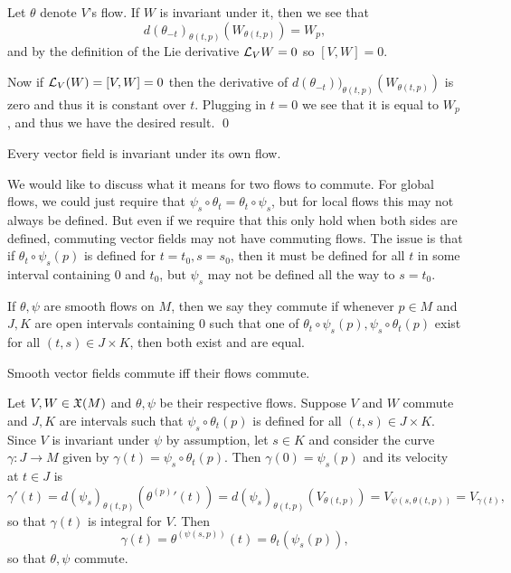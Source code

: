 \ethrm

\bproof

    Let $\theta$ denote $V$'s flow.
    If $W$ is invariant under it, then we see that
    $$ d(\theta_{-t})_{\theta(t,p)}(W_{\theta(t,p)}) = W_p , $$
    and by the definition of the Lie derivative ${{\cal L}}_VW=0$ so $[V,W]=0$.

    Now if ${{\cal L}}_V(W)=[V,W]=0$ then the derivative of $d(\theta_{-t}))_{\theta(t,p)}(W_{\theta(t,p)})$ is zero
    and thus it is constant over $t$.
    Plugging in $t=0$ we see that it is equal to $W_p$, and thus we have the desired result.
    \qed

\eproof

\bcoro

    Every vector field is invariant under its own flow.

\ecoro

We would like to discuss what it means for two flows to commute.
For global flows, we could just require that $\psi_s\circ\theta_t=\theta_t\circ\psi_s$, but for local flows this may not
always be defined.
But even if we require that this only hold when both sides are defined, commuting vector fields may not have commuting flows.
The issue is that if $\theta_t\circ\psi_s(p)$ is defined for $t=t_0,s=s_0$, then it must be defined for all $t$ in some
interval containing $0$ and $t_0$, but $\psi_s$ may not be defined all the way to $s=t_0$.

\bdefn

    If $\theta,\psi$ are smooth flows on $M$, then we say they {\emphcolor commute} if whenever $p\in M$ and
    $J,K$ are open intervals containing $0$ such that one of $\theta_t\circ\psi_s(p),\psi_s\circ\theta_t(p)$ exist
    for all $(t,s)\in J\times K$, then both exist and are equal.

\edefn

\bthrm

    Smooth vector fields commute iff their flows commute.

\ethrm

\bproof

    Let $V,W\in{\frak X}(M)$ and $\theta,\psi$ be their respective flows.
    Suppose $V$ and $W$ commute and $J,K$ are intervals such that $\psi_s\circ\theta_t(p)$ is defined for all
    $(t,s)\in J\times K$.
    Since $V$ is invariant under $\psi$ by assumption, let $s\in K$ and consider the curve $\gamma\colon J\to M$
    given by $\gamma(t)=\psi_s\circ\theta_t(p)$.
    Then $\gamma(0)=\psi_s(p)$ and its velocity at $t\in J$ is
    $$ \gamma'(t) = d(\psi_s)_{\theta(t,p)}({\theta^{(p)}}'(t)) = d(\psi_s)_{\theta(t,p)}(V_{\theta(t,p)})
    = V_{\psi(s,\theta(t,p))} = V_{\gamma(t)} , $$
    so that $\gamma(t)$ is integral for $V$.
    Then
    $$ \gamma(t) = \theta^{(\psi(s,p))}(t) = \theta_t(\psi_s(p)) , $$
    so that $\theta,\psi$ commute.

